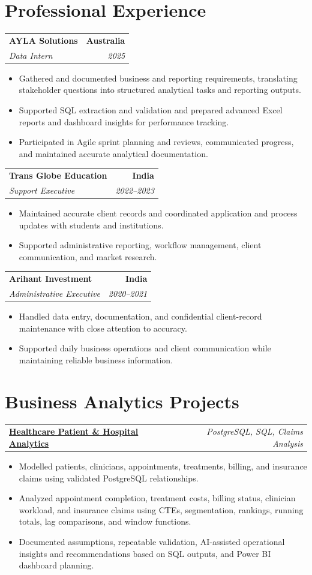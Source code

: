\documentclass[letterpaper,10pt]{article}
\makeatletter
\newcommand{\role}[4]{%
  \begin{tabularx}{\textwidth}{@{}Xr@{}}
    \textbf{#1} & \textbf{#2} \\
    \textit{#3} & \textit{#4}
  \end{tabularx}\vspace{-1pt}
}
\newcommand{\project}[2]{%
  \begin{tabularx}{\textwidth}{@{}Xr@{}}
    \textbf{#1} & \textit{#2}
  \end{tabularx}\vspace{-1pt}
}
\makeatother
\begin{document}
\section{Professional Experience}
\role{AYLA Solutions}{Australia}{Data Intern}{2025}
\begin{itemize}
  \item Gathered and documented business and reporting requirements, translating stakeholder questions into structured analytical tasks and reporting outputs.
  \item Supported SQL extraction and validation and prepared advanced Excel reports and dashboard insights for performance tracking.
  \item Participated in Agile sprint planning and reviews, communicated progress, and maintained accurate analytical documentation.
\end{itemize}
\vspace{1pt}

\role{Trans Globe Education}{India}{Support Executive}{2022--2023}
\begin{itemize}
  \item Maintained accurate client records and coordinated application and process updates with students and institutions.
  \item Supported administrative reporting, workflow management, client communication, and market research.
\end{itemize}
\vspace{1pt}

\role{Arihant Investment}{India}{Administrative Executive}{2020--2021}
\begin{itemize}
  \item Handled data entry, documentation, and confidential client-record maintenance with close attention to accuracy.
  \item Supported daily business operations and client communication while maintaining reliable business information.
\end{itemize}

\section{Business Analytics Projects}
\project{\href{https://github.com/jainalimehta/Healthcare-Analytics}{Healthcare Patient \& Hospital Analytics}}{PostgreSQL, SQL, Claims Analysis}
\begin{itemize}
  \item Modelled patients, clinicians, appointments, treatments, billing, and insurance claims using validated PostgreSQL relationships.
  \item Analyzed appointment completion, treatment costs, billing status, clinician workload, and insurance claims using CTEs, segmentation, rankings, running totals, lag comparisons, and window functions.
  \item Documented assumptions, repeatable validation, AI-assisted operational insights and recommendations based on SQL outputs, and Power BI dashboard planning.
\end{itemize}
\vspace{1pt}
\end{document}
